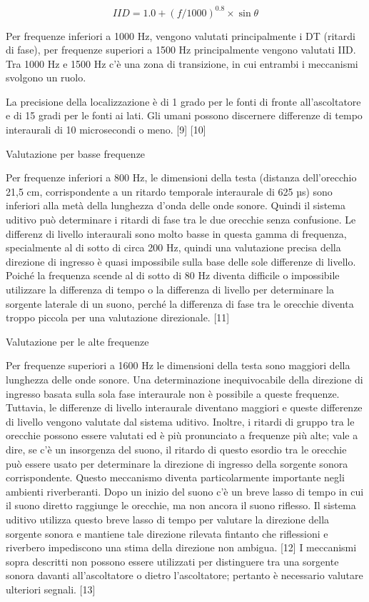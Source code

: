 \begin{equation}
IID = 1.0+(f/1000)^{0.8}\times\sin\theta
\end{equation}

Per frequenze inferiori a 1000 Hz, vengono valutati principalmente i DT
(ritardi di fase), per frequenze superiori a 1500 Hz principalmente vengono
valutati IID. Tra 1000 Hz e 1500 Hz c'è una zona di transizione, in cui entrambi
i meccanismi svolgono un ruolo.

La precisione della localizzazione è di 1 grado per le fonti di fronte
all'ascoltatore e di 15 gradi per le fonti ai lati. Gli umani possono discernere
differenze di tempo interaurali di 10 microsecondi o meno. [9] [10]

Valutazione per basse frequenze

Per frequenze inferiori a 800 Hz, le dimensioni della testa (distanza dell'orecchio
21,5 cm, corrispondente a un ritardo temporale interaurale di 625 µs) sono inferiori
alla metà della lunghezza d'onda delle onde sonore. Quindi il sistema uditivo può
determinare i ritardi di fase tra le due orecchie senza confusione. Le differenz
di livello interaurali sono molto basse in questa gamma di frequenza, specialmente
al di sotto di circa 200 Hz, quindi una valutazione precisa della direzione di
ingresso è quasi impossibile sulla base delle sole differenze di livello. Poiché
la frequenza scende al di sotto di 80 Hz diventa difficile o impossibile utilizzare
la differenza di tempo o la differenza di livello per determinare la sorgente
laterale di un suono, perché la differenza di fase tra le orecchie diventa troppo
piccola per una valutazione direzionale. [11]

Valutazione per le alte frequenze

Per frequenze superiori a 1600 Hz le dimensioni della testa sono maggiori della
lunghezza delle onde sonore. Una determinazione inequivocabile della direzione
di ingresso basata sulla sola fase interaurale non è possibile a queste frequenze.
Tuttavia, le differenze di livello interaurale diventano maggiori e queste differenze
di livello vengono valutate dal sistema uditivo. Inoltre, i ritardi di gruppo tra
le orecchie possono essere valutati ed è più pronunciato a frequenze più alte;
vale a dire, se c'è un insorgenza del suono, il ritardo di questo esordio tra le
orecchie può essere usato per determinare la direzione di ingresso della sorgente
sonora corrispondente. Questo meccanismo diventa particolarmente importante negli
ambienti riverberanti. Dopo un inizio del suono c'è un breve lasso di tempo in
cui il suono diretto raggiunge le orecchie, ma non ancora il suono riflesso. Il
sistema uditivo utilizza questo breve lasso di tempo per valutare la direzione
della sorgente sonora e mantiene tale direzione rilevata fintanto che riflessioni
e riverbero impediscono una stima della direzione non ambigua. [12] I meccanismi
sopra descritti non possono essere utilizzati per distinguere tra una sorgente
sonora davanti all'ascoltatore o dietro l'ascoltatore; pertanto è necessario
valutare ulteriori segnali. [13]

